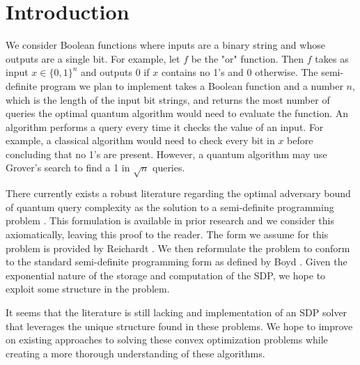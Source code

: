 \section{Introduction}

We consider Boolean functions where inputs
are a binary string and whose outputs are a single bit.
For example, let $f$ be the "or" function.
Then $f$ takes as input $x \in \{0,1\}^n$ and outputs
0 if $x$ contains no 1's and 0 otherwise.
The semi-definite program we plan to implement
takes a Boolean function and a number $n$, which is the
length of the input bit strings, and returns the most
number of queries the optimal quantum
algorithm would need to evaluate the function.
An algorithm performs a query every time it checks the value
of an input.
For example, a classical algorithm would need to check every
bit in $x$ before concluding that no 1's are present.
However, a quantum algorithm may use Grover's search
to find a 1 in $\sqrt{n}$ queries.

There currently exists a robust literature regarding the
optimal adversary bound of quantum query complexity as
the solution to a semi-definite programming problem
\cite{beigi2018span}. This formulation is available in
prior research and we consider this axiomatically,
leaving this proof to the reader. The form we assume for
this problem is provided by Reichardt
\cite{reichardt2009span}. We then reformulate the problem
to conform to the standard semi-definite programming form
as defined by Boyd \cite{boyd2004convex}. Given the
exponential nature of the storage and computation of the
SDP, we hope to exploit some structure in the problem.

It seems that the literature is still lacking and
implementation of an
SDP solver that leverages the unique structure found in
these problems. We hope to improve on existing approaches
to solving these convex optimization problems while
creating a more thorough understanding of these
algorithms.